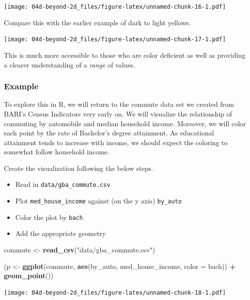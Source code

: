 \documentclass[
]{book}
\newenvironment{Shaded}{\begin{snugshade}}{\end{snugshade}}
\newcommand{\DataTypeTok}[1]{\textcolor[rgb]{0.13,0.29,0.53}{#1}}
\newcommand{\KeywordTok}[1]{\textcolor[rgb]{0.13,0.29,0.53}{\textbf{#1}}}
\newcommand{\NormalTok}[1]{#1}
\newcommand{\OperatorTok}[1]{\textcolor[rgb]{0.81,0.36,0.00}{\textbf{#1}}}
\newcommand{\StringTok}[1]{\textcolor[rgb]{0.31,0.60,0.02}{#1}}
\providecommand{\tightlist}{%
  \setlength{\itemsep}{0pt}\setlength{\parskip}{0pt}}
\begin{document}
\texttt{[image: 04d-beyond-2d\_files/figure-latex/unnamed-chunk-16-1.pdf]}

Compare this with the earlier example of dark to light yellows.

\texttt{[image: 04d-beyond-2d\_files/figure-latex/unnamed-chunk-17-1.pdf]}

This is much more accessible to those who are color deficient as well as providing a clearer understanding of a \emph{range} of values.

\hypertarget{example}{%
\subsubsection{Example}\label{example}}

To explore this in R, we will return to the commute data set we created from BARI's Census Indicators very early on. We will visualize the relationship of commuting by automobile and median household income. Moreover, we will color each point by the rate of Bachelor's degree attainment. As educational attainment tends to increase with income, we should expect the coloring to somewhat follow household income.

Create the visualization following the below steps.

\begin{itemize}
\tightlist
\item
  Read in \texttt{data/gba\_commute.csv}
\item
  Plot \texttt{med\_house\_income} against (on the y axis) \texttt{by\_auto}
\item
  Color the plot by \texttt{bach}
\item
  Add the appropriate geometry
\end{itemize}

\begin{Shaded}
\begin{Highlighting}[]
\NormalTok{commute \textless{}{-}}\StringTok{ }\KeywordTok{read\_csv}\NormalTok{(}\StringTok{"data/gba\_commute.csv"}\NormalTok{)}

\NormalTok{(p \textless{}{-}}\StringTok{ }\KeywordTok{ggplot}\NormalTok{(commute, }\KeywordTok{aes}\NormalTok{(by\_auto, med\_house\_income, }\DataTypeTok{color =}\NormalTok{ bach)) }\OperatorTok{+}
\StringTok{  }\KeywordTok{geom\_point}\NormalTok{())}
\end{Highlighting}
\end{Shaded}

\texttt{[image: 04d-beyond-2d\_files/figure-latex/unnamed-chunk-18-1.pdf]}
\end{document}
